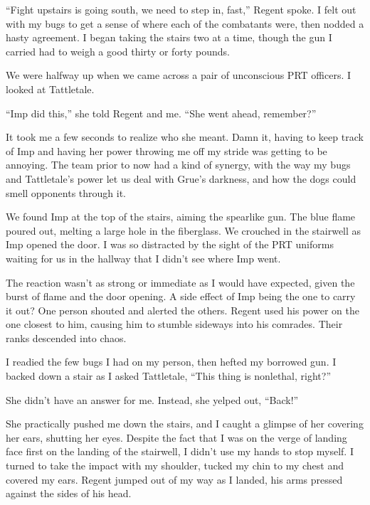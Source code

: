 ``Fight upstairs is going south, we need to step in, fast,'' Regent spoke.  I felt out with my bugs to get a sense of where each of the combatants were, then nodded a hasty agreement.  I began taking the stairs two at a time, though the gun I carried had to weigh a good thirty or forty pounds.



We were halfway up when we came across a pair of unconscious PRT officers.  I looked at Tattletale.



``Imp did this,'' she told Regent and me.  ``She went ahead, remember?''



It took me a few seconds to realize who she meant.  Damn it, having to keep track of Imp and having her power throwing me off my stride was getting to be annoying.  The team prior to now had a kind of synergy, with the way my bugs and Tattletale's power let us deal with Grue's darkness, and how the dogs could smell opponents through it.



We found Imp at the top of the stairs, aiming the spearlike gun.  The blue flame poured out, melting a large hole in the fiberglass.  We crouched in the stairwell as Imp opened the door.  I was so distracted by the sight of the PRT uniforms waiting for us in the hallway that I didn't see where Imp went.



The reaction wasn't as strong or immediate as I would have expected, given the burst of flame and the door opening.  A side effect of Imp being the one to carry it out?  One person shouted and alerted the others.  Regent used his power on the one closest to him, causing him to stumble sideways into his comrades. Their ranks descended into chaos.



I readied the few bugs I had on my person, then hefted my borrowed gun.  I backed down a stair as I asked Tattletale, ``This thing is nonlethal, right?''



She didn't have an answer for me.  Instead, she yelped out, ``Back!''



She practically pushed me down the stairs, and I caught a glimpse of her covering her ears, shutting her eyes.  Despite the fact that I was on the verge of landing face first on the landing of the stairwell, I didn't use my hands to stop myself.  I turned to take the impact with my shoulder, tucked my chin to my chest and covered my ears.  Regent jumped out of my way as I landed, his arms pressed against the sides of his head.



